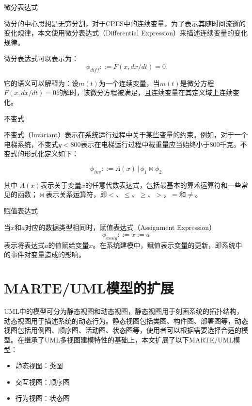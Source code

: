 	\begin{myDef}微分表达式\end{myDef}
	微分的中心思想是无穷分割，对于CPES中的连续变量，为了表示其随时间流逝的变化规律，本文使用微分表达式（Differential Expression）来描述连续变量的变化规律。
	
	微分表达式可以表示为：
	\begin{equation}
	\phi_{diff}::=F(x,dx/dt)=0
	\end{equation}
	
	它的语义可以解释为：设$m(t)$为一个连续变量，当$m(t)$是微分方程$F(x,dx/dt)=0$的解时，该微分方程被满足，且连续变量在其定义域上连续变化。
	
	\begin{myDef}不变式\end{myDef}
	不变式（Invariant）表示在系统运行过程中关于某些变量的约束。例如，对于一个电梯系统，不变式$y<800$表示在电梯运行过程中载重量应当始终小于800千克。不变式的形式化定义如下：
	
	\begin{equation}
	\phi_{inv}::=A(x) \,|\, \phi_{1}\bowtie\phi_{2}
	\end{equation}
	
	其中 $A(x)$表示关于变量$x$的任意代数表达式，包括最基本的算术运算符和一些常见的函数；$\bowtie$表示关系运算符，即$<$、$\leqslant$、$\geqslant$、$>$，$=$和$\not=$。

	\begin{myDef}赋值表达式\end{myDef}
	当$x$和$a$对应的数据类型相同时，赋值表达式（Assignment Expression）
	\begin{equation}
	\phi_{assig}::=x:=a
	\end{equation}
	表示将表达式$a$的值赋给变量$x$。在系统建模中，赋值表示变量的更新，即系统中的事件对变量造成的影响。

\section{MARTE/UML模型的扩展}
	UML中的模型可分为静态视图和动态视图，静态视图用于刻画系统的拓扑结构，动态视图用于描述系统的动态行为。静态视图包括类图、构件图、部署图等，动态视图包括用例图、顺序图、活动图、状态图等，使用者可以根据需要选择合适的模型。在继承了UML多视图建模特性的基础上，本文扩展了以下MARTE/UML模型：
	\begin{itemize}
	\item 静态视图：类图
	\item 交互视图：顺序图
	\item 行为视图：状态图
	\end{itemize}
	
